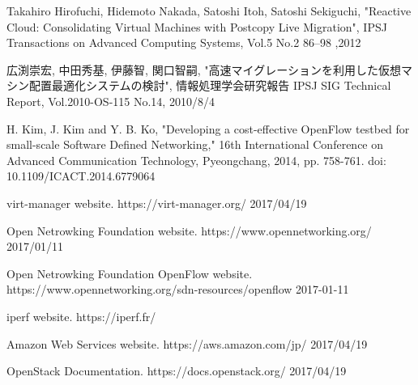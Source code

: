 \documentclass[submit,techrep]{ipsj}
\begin{document}
\begin{thebibliography}{10}


  Takahiro Hirofuchi, Hidemoto Nakada, Satoshi Itoh, Satoshi Sekiguchi, "Reactive Cloud: Consolidating Virtual Machines with Postcopy Live Migration", IPSJ Transactions on Advanced Computing Systems, Vol.5 No.2 86–98 ,2012

  広渕崇宏, 中田秀基, 伊藤智, 関口智嗣, "高速マイグレーションを利用した仮想マシン配置最適化システムの検討", 情報処理学会研究報告 IPSJ SIG Technical Report, Vol.2010-OS-115 No.14, 2010/8/4

  H. Kim, J. Kim and Y. B. Ko, "Developing a cost-effective OpenFlow testbed for small-scale Software Defined Networking," 16th International Conference on Advanced Communication Technology, Pyeongchang, 2014, pp. 758-761.
  doi: 10.1109/ICACT.2014.6779064

  virt-manager website. https://virt-manager.org/ 2017/04/19

  Open Netrowking Foundation website. https://www.opennetworking.org/ 2017/01/11

  Open Netrowking Foundation OpenFlow website. https://www.opennetworking.org/sdn-resources/openflow 2017-01-11



  iperf website.  https://iperf.fr/

  Amazon Web Services website. https://aws.amazon.com/jp/ 2017/04/19

  OpenStack Documentation. https://docs.openstack.org/ 2017/04/19




\end{thebibliography}
\end{document}
